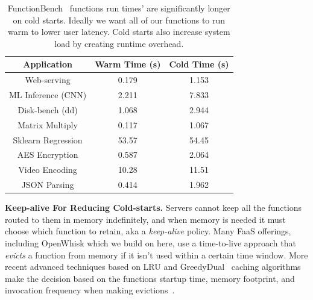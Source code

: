 \begin{table}
  \begin{tabular}{ c c c }
\hline
  Application & Warm Time (s) & Cold Time (s) \\ 
\hline
  Web-serving & 0.179 & 1.153 \\  
  ML Inference (CNN) & 2.211 & 7.833 \\
  Disk-bench (dd) & 1.068 & 2.944 \\  
  Matrix Multiply & 0.117 & 1.067 \\  
  Sklearn Regression & 53.57 & 54.45 \\  
  AES Encryption & 0.587 & 2.064 \\  
  Video Encoding & 10.28 & 11.51 \\  
  JSON Parsing & 0.414 & 1.962 \\
\hline
\end{tabular}
\caption{FunctionBench~\cite{kim_functionbench_2019} functions run times' are significantly longer on cold starts. Ideally we want all of our functions to run warm to lower user latency. Cold starts also increase system load by creating runtime overhead.}
\label{tab:func-times}
\end{table}



\noindent \textbf{Keep-alive For Reducing Cold-starts.}
Servers cannot keep all the functions routed to them in memory indefinitely, and when memory is needed it must choose which function to retain, aka a \emph{keep-alive} policy.
Many FaaS offerings, including OpenWhisk which we build on here, use a time-to-live approach that \emph{evicts} a function from memory if it isn't used within a certain time window.
%
More recent advanced techniques based on LRU and GreedyDual~\cite{gdsf} caching algorithms make the decision based on the functions startup time, memory footprint, and invocation frequency when making evictions~\cite{faascache-asplos21}.

